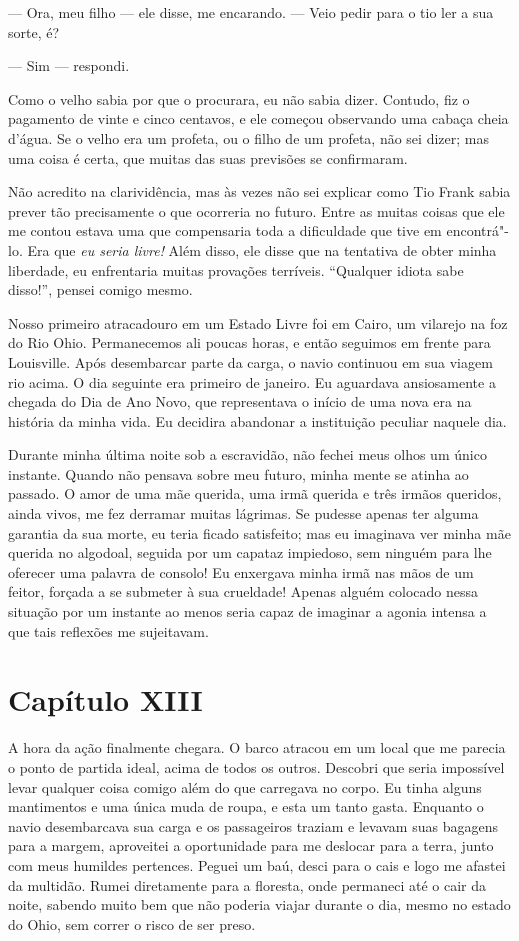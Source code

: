 --- Ora, meu filho --- ele disse, me encarando. --- Veio pedir para o tio
ler a sua sorte, é?

--- Sim --- respondi.

Como o velho sabia por que o procurara, eu não sabia dizer. Contudo, fiz
o pagamento de vinte e cinco centavos, e ele começou observando uma
cabaça cheia d'água. Se o velho era um profeta, ou o filho de um
profeta, não sei dizer; mas uma coisa é certa, que muitas das suas
previsões se confirmaram.

Não acredito na clarividência, mas às vezes não sei explicar como Tio
Frank sabia prever tão precisamente o que ocorreria no futuro. Entre as
muitas coisas que ele me contou estava uma que compensaria toda a
dificuldade que tive em encontrá"-lo. Era que \emph{eu seria livre!} Além
disso, ele disse que na tentativa de obter minha liberdade, eu
enfrentaria muitas provações terríveis. ``Qualquer idiota sabe disso!'',
pensei comigo mesmo.

Nosso primeiro atracadouro em um Estado Livre foi em Cairo, um vilarejo
na foz do Rio Ohio. Permanecemos ali poucas horas, e então seguimos em
frente para Louisville. Após desembarcar parte da carga, o navio
continuou em sua viagem rio acima. O dia seguinte era primeiro de
janeiro. Eu aguardava ansiosamente a chegada do Dia de Ano Novo, que
representava o início de uma nova era na história da minha vida. Eu
decidira abandonar a instituição peculiar naquele dia.

Durante minha última noite sob a escravidão, não fechei meus olhos um
único instante. Quando não pensava sobre meu futuro, minha mente se
atinha ao passado. O amor de uma mãe querida, uma irmã querida e três
irmãos queridos, ainda vivos, me fez derramar muitas lágrimas. Se
pudesse apenas ter alguma garantia da sua morte, eu teria ficado
satisfeito; mas eu imaginava ver minha mãe querida no algodoal, seguida
por um capataz impiedoso, sem ninguém para lhe oferecer uma palavra de
consolo! Eu enxergava minha irmã nas mãos de um feitor, forçada a se
submeter à sua crueldade! Apenas alguém colocado nessa situação por um \label{ref10} 
instante ao menos seria capaz de imaginar a agonia intensa a que tais
reflexões me sujeitavam. 

\chapter*{Capítulo XIII}

A hora da ação finalmente chegara. O barco atracou em um local que me
parecia o ponto de partida ideal, acima de todos os outros. Descobri que
seria impossível levar qualquer coisa comigo além do que carregava no
corpo. Eu tinha alguns mantimentos e uma única muda de roupa, e esta um
tanto gasta. Enquanto o navio desembarcava sua carga e os passageiros
traziam e levavam suas bagagens para a margem, aproveitei a oportunidade
para me deslocar para a terra, junto com meus humildes pertences. Peguei
um baú, desci para o cais e logo me afastei da multidão. Rumei
diretamente para a floresta, onde permaneci até o cair da noite, sabendo
muito bem que não poderia viajar durante o dia, mesmo no estado do Ohio,
sem correr o risco de ser preso.

